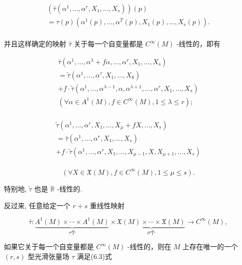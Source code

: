 $$
\begin{array}{l} (\bar {\tau} (\alpha^ {1}, \dots , \alpha^ {r}, X _ {1}, \dots , X _ {s})) (p) \\ = \tau (p) \left(\alpha^ {1} (p), \dots , \alpha^ {T} (p), X _ {1} (p), \dots , X _ {s} (p)\right). %
\\ \end{array}
$$

并且这样确定的映射  $\hat{\tau}$  关于每一个自变量都是  $C^\infty (M)$  -线性的，即有

$$
\begin{array}{l} \bar {\tau} \left(\alpha^ {1}, \dots , \alpha^ {\lambda} + f \alpha , \dots , \alpha^ {r}, X _ {1}, \dots , X _ {s}\right) \\ = \tilde {\tau} \left(\alpha^ {1}, \dots , \alpha^ {\tau}, X _ {1}, \dots , X _ {8}\right) \\ + f \cdot \tilde {\tau} (\alpha^ {1}, \dots , \alpha^ {\lambda - 1}, \alpha , \alpha^ {\lambda + 1}, \dots , \alpha^ {r}, X _ {1}, \dots , X _ {s}) \\ (\forall \alpha \in A ^ {1} (M), f \in C ^ {\infty} (M), 1 \leqslant \lambda \leqslant r); %
 \\ \end{array}
$$

$$
\begin{array}{l} \tilde {\tau} \left(\alpha^ {1}, \dots , \alpha^ {r}, X _ {1}, \dots , X _ {\mu} + f X, \dots , X _ {s}\right) \\ = \bar {\tau} \left(\alpha^ {1}, \dots , \alpha^ {r}, X _ {1}, \dots , X _ {s}\right) \\ + f \cdot \tilde {\tau} \left(\alpha^ {1}, \dots , \alpha^ {r}, X _ {1}, \dots , X _ {\mu - 1}, X, X _ {\mu + 1}, \dots , X _ {s}\right) \\ \end{array}
$$

$$
(\forall X \in \mathfrak {X} (M), f \in C ^ {\infty} (M), 1 \leqslant \mu \leqslant s). %
$$

特别地,  $\tilde{\tau}$  也是  $\mathbb{R}$ -线性的.

反过来, 任意给定一个  $r + s$  重线性映射

$$
\bar {\tau}: \underbrace {A ^ {1} (M) \times \cdots \times A ^ {1} (M)} _ {\tau \text {个}} \times \underbrace {\mathfrak {X} (M) \times \cdots \times \mathfrak {X} (M)} _ {\vartheta \text {个}} \to C ^ {\infty} (M),
$$

如果它关于每一个自变量都是  $C^\infty (M)$  -线性的，则在  $M$  上存在唯一的一个  $(r,s)$  型光滑张量场  $\tau$  满足(6.3)式

